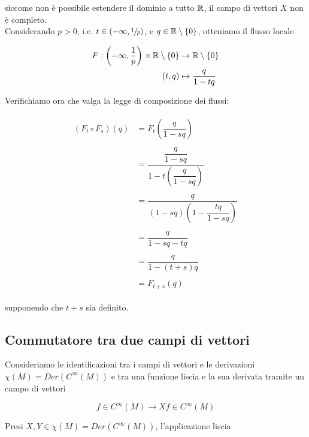 siccome non è possibile estendere il dominio a tutto $ \mathbb{R} $, il campo di vettori $ X $ non è completo.\\
Considerando $ p>0 $, i.e. $ t \in (-\infty, \sfrac{1}{p}) $, e $ q \in \mathbb{R} \setminus \{0\} $, otteniamo il flusso locale

\begin{align}
	\begin{split}
		F : \left( -\infty, \dfrac{1}{p} \right) \times \mathbb{R} \setminus \{0\} &\to \mathbb{R} \setminus \{0\}\\
		(t,q) &\mapsto \dfrac{q}{1 - t q}
	\end{split}
\end{align}

Verifichiamo ora che valga la legge di composizione dei flussi:

\begin{align}
	\begin{split}
		(F_{t} \circ F_{s})(q) &= F_{t} \left( \dfrac{q}{1 - s q} \right)\\\\
		&= \dfrac{\dfrac{q}{1 - s q}}{1 - t \left( \dfrac{q}{1 - s q} \right)}\\\\
		&= \dfrac{q}{(1 - s q) \left(1 - \dfrac{t q}{1 - s q} \right)}\\\\
		&= \dfrac{q}{1 - s q - t q}\\\\
		&= \dfrac{q}{1 - (t+s) q}\\\\
		&= F_{t+s}(q)
	\end{split}
\end{align}

supponendo che $ t+s $ sia definito.

\subsection{Commutatore tra due campi di vettori}

Consideriamo le identificazioni tra i campi di vettori e le derivazioni $ \chi(M) = Der(C^{\infty}(M)) $ e tra una funzione liscia e la sua derivata tramite un campo di vettori

\begin{equation}
	f \in C^{\infty}(M) \to X f \in C^{\infty}(M)
\end{equation}

Presi $ X,Y \in \chi(M) = Der(C^{\infty}(M)) $, l'applicazione liscia

